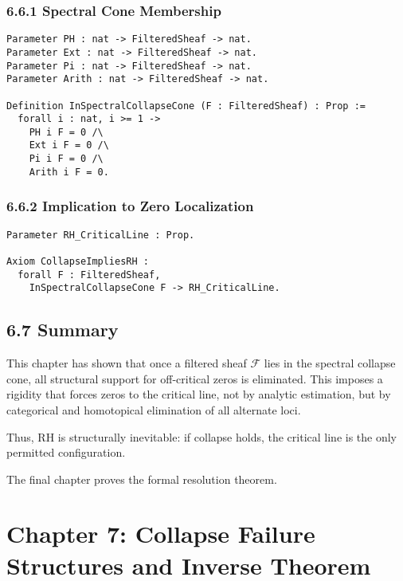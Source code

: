 \documentclass[11pt]{article}
\begin{document}
\subsubsection*{6.6.1 Spectral Cone Membership}

\begin{lstlisting}[language=Coq, caption=Spectral Collapse Cone Predicate, captionpos=b]
Parameter PH : nat -> FilteredSheaf -> nat.
Parameter Ext : nat -> FilteredSheaf -> nat.
Parameter Pi : nat -> FilteredSheaf -> nat.
Parameter Arith : nat -> FilteredSheaf -> nat.

Definition InSpectralCollapseCone (F : FilteredSheaf) : Prop :=
  forall i : nat, i >= 1 ->
    PH i F = 0 /\
    Ext i F = 0 /\
    Pi i F = 0 /\
    Arith i F = 0.
\end{lstlisting}

\subsubsection*{6.6.2 Implication to Zero Localization}

\begin{lstlisting}[language=Coq, caption=Spectral Collapse ⇒ RH Constraint, captionpos=b]
Parameter RH_CriticalLine : Prop.

Axiom CollapseImpliesRH :
  forall F : FilteredSheaf,
    InSpectralCollapseCone F -> RH_CriticalLine.
\end{lstlisting}

\subsection*{6.7 Summary}

This chapter has shown that once a filtered sheaf \( \mathcal{F} \) lies in the spectral collapse cone, all structural support for off-critical zeros is eliminated. This imposes a rigidity that forces zeros to the critical line, not by analytic estimation, but by categorical and homotopical elimination of all alternate loci.

Thus, RH is structurally inevitable: if collapse holds, the critical line is the only permitted configuration.

The final chapter proves the formal resolution theorem.



\section*{Chapter 7: Collapse Failure Structures and Inverse Theorem}
\end{document}
